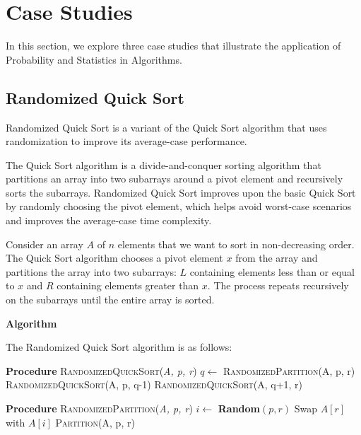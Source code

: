 \documentclass[12pt]{book} %
\begin{document}
\section{Case Studies}
In this section, we explore three case studies that illustrate the application of Probability and Statistics in Algorithms.

\subsection{Randomized Quick Sort}
Randomized Quick Sort is a variant of the Quick Sort algorithm that uses randomization to improve its average-case performance.

The Quick Sort algorithm is a divide-and-conquer sorting algorithm that partitions an array into two subarrays around a pivot element and recursively sorts the subarrays. Randomized Quick Sort improves upon the basic Quick Sort by randomly choosing the pivot element, which helps avoid worst-case scenarios and improves the average-case time complexity.

Consider an array \(A\) of \(n\) elements that we want to sort in non-decreasing order. The Quick Sort algorithm chooses a pivot element \(x\) from the array and partitions the array into two subarrays: \(L\) containing elements less than or equal to \(x\) and \(R\) containing elements greater than \(x\). The process repeats recursively on the subarrays until the entire array is sorted.

\textbf{Algorithm}

The Randomized Quick Sort algorithm is as follows:
\FloatBarrier
\begin{algorithm}
\caption{Randomized Quick Sort}
\begin{algorithmic}[1]
\State \textbf{Procedure} \textsc{RandomizedQuickSort}(\textit{A, p, r})
    \State $q \leftarrow$ \textsc{RandomizedPartition}(A, p, r)
    \State \textsc{RandomizedQuickSort}(A, p, q-1)
    \State \textsc{RandomizedQuickSort}(A, q+1, r)
\EndIf
\end{algorithmic}
\end{algorithm}

\begin{algorithm}
\caption{Randomized Partition}
\begin{algorithmic}[1]
\State \textbf{Procedure} \textsc{RandomizedPartition}(\textit{A, p, r})
\State $i \leftarrow$ \textbf{Random}$(p, r)$
\State Swap $A[r]$ with $A[i]$
\Return \textsc{Partition}(A, p, r)
\end{algorithmic}
\end{algorithm}
\FloatBarrier
\end{document}
